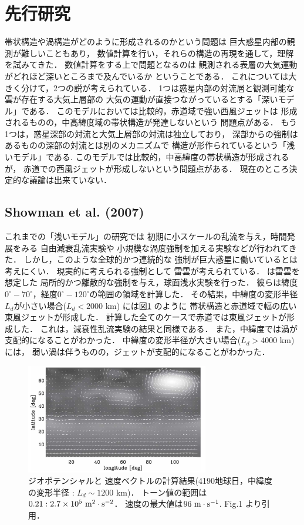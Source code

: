 \documentclass[a4j,12pt,openbib,oneside]{jreport}
\begin{document}
\section{先行研究}
\label{sec:intro2}
帯状構造や渦構造がどのように形成されるのかという問題は
巨大惑星内部の観測が難しいこともあり，
数値計算を行い，それらの構造の再現を通して，理解を試みてきた．
%
数値計算をする上で問題となるのは
観測される表層の大気運動がどれほど深いところまで及んでいるか
ということである．
これについては大きく分けて，2つの説が考えられている．
%
1つは惑星内部の対流層と観測可能な雲が存在する大気上層部の
大気の運動が直接つながっているとする「深いモデル」である．
このモデルにおいては比較的，赤道域で強い西風ジェットは
形成されるものの，中高緯度域の帯状構造が発達しないという
問題点がある\citep{CHRISTENSEN2002}．
%
もう1つは，惑星深部の対流と大気上層部の対流は独立しており，
深部からの強制はあるものの深部の対流とは別のメカニズムで
構造が形作られているという「浅いモデル」である.
このモデルでは比較的，中高緯度の帯状構造が形成されるが，
赤道での西風ジェットが形成しないという問題点がある\citep{Scott2007}．
%
現在のところ決定的な議論は出来ていない．
%
%
\subsection{Showman et al. (2007)}
\label{sec:intro21}
これまでの「浅いモデル」の研究では
初期に小スケールの乱流を与え，時間発展をみる
自由減衰乱流実験\citep{Yoden1993}や
小規模な渦度強制を加える実験\citep{Scott2007}などが行われてきた．
%
しかし，このような全球的かつ連続的な
強制が巨大惑星に働いているとは考えにくい．
%
現実的に考えられる強制として
雷雲\citep{Gierasch2000, Porco2005, Ingersoll2000}が考えられている．
%
\cite{Showman2007}は雷雲を想定した
局所的かつ離散的な強制を与え，球面浅水実験を行った．
彼らは緯度$0^\circ - 70^\circ$，経度$0^\circ - 120^\circ$の範囲の領域を計算した．
その結果，中緯度の変形半径$L_d$が小さい場合($L_d < 2000$ km) には図\ref{fig3} のように
帯状構造と赤道域で幅の広い東風ジェットが形成した．
計算した全てのケースで赤道では東風ジェットが形成した．
これは，減衰性乱流実験の結果と同様である\citep{Cho1996}．
また，中緯度では渦が支配的になることがわかった．
%
中緯度の変形半径が大きい場合($L_d > 4000$ km) には，
弱い渦は伴うものの，ジェットが支配的になることがわかった．
%
%
\begin{figure}[H]
  \begin{center}
    \includegraphics[clip,width=8cm]{./fig/intro/fig3.png}
    \caption{
      \footnotesize{ジオポテンシャルと
速度ベクトルの計算結果(4190地球日，中緯度の変形半径 : $L_d \sim 1200$ km)．
トーン値の範囲は$0.21 : 2.7 \times 10^5 \rm{~m^2 \cdot s^{-2}}$．
速度の最大値は$96 \rm{~m \cdot s^{-1}}$.
\cite{Showman2007} Fig.1 より引用．
      }
    }
    \label{fig3}
  \end{center}
\end{figure}
%
\end{document}

